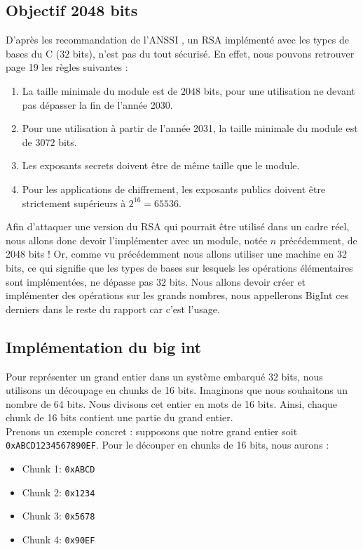 \subsection{Objectif 2048 bits}
D'après les recommandation de l'ANSSI \cite{anssi:guide}, un RSA implémenté avec les types de bases du C ($32$ bits), n'est pas du tout sécurisé. En effet, nous pouvons retrouver page 19 les règles suivantes :
\begin{enumerate}
  \item La taille minimale du module est de $2048$ bits, pour une utilisation ne devant
pas dépasser la fin de l’année 2030.
  \item Pour une utilisation à partir de l’année 2031, la taille minimale du module
est de $3072$ bits.
  \item Les exposants secrets doivent être de même taille que le module.
  \item Pour les applications de chiffrement, les exposants publics doivent être strictement supérieurs à $2^{16} = 65536$.
\end{enumerate}
Afin d'attaquer une version du RSA qui pourrait être utilisé dans un cadre réel, nous allons donc devoir l'implémenter avec un module, notée $n$ précédemment, de 2048 bits ! Or, comme vu précédemment nous allons utiliser une machine en 32 bits, ce qui signifie que les types de bases sur lesquels les opérations élémentaires sont implémentées, ne dépasse pas 32 bits. Nous allons devoir créer et implémenter des opérations sur les grands nombres, nous appellerons BigInt ces derniers dans le reste du rapport car c'est l'usage.

\subsection{Implémentation du big int}
Pour représenter un grand entier dans un système embarqué 32 bits, nous utilisons un découpage en chunks de 16 bits. Imaginons que nous souhaitons un nombre de 64 bits. Nous divisons cet entier en mots de 16 bits. Ainsi, chaque chunk de 16 bits contient une partie du grand entier.\\

Prenons un exemple concret : supposons que notre grand entier soit \texttt{0xABCD1234567890EF}. Pour le découper en chunks de 16 bits, nous aurons :

\begin{itemize}
\item Chunk 1: \texttt{0xABCD}
\item Chunk 2: \texttt{0x1234}
\item Chunk 3: \texttt{0x5678}
\item Chunk 4: \texttt{0x90EF}
\end{itemize}

